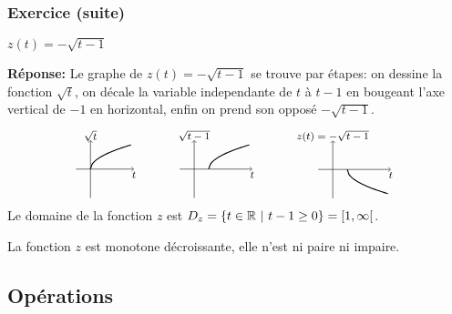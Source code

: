 \begin{frame}[plain]
\frametitle{\bf Exercice (suite)}
\medskip 

\begin{itemize}
\bitem
$z(t)=-\sqrt{t-1}$
\end{itemize}
\vspace*{2mm}

\pause
{\bf R\'eponse:}
Le graphe de $z(t)= -\sqrt{t-1}$ se trouve par \'etapes: 
on dessine la fonction $\sqrt{t}$, on d\'ecale la variable independante 
de $t$ \`a $t-1$ en bougeant l'axe vertical de $-1$ en horizontal, 
enfin on prend son oppos\'e $-\sqrt{t-1}$.
$$
\raisebox{-\height}{\exoSQRTA} \qquad
\raisebox{-\height}{\exoSQRTB} \qquad
\raisebox{-\height}{\exoSQRTC} 
$$
\pause
Le domaine de la fonction $z$ est\quad 
$D_z=\{ t\in\mathbb R\ |\ t-1\geq 0 \} = [1,\infty[$. 
\vspace*{1mm}

\parbox{10cm}{
La fonction $z$ est monotone d\'ecroissante, elle n'est ni paire ni impaire.}

\end{frame}


\subsection{Op\'erations} 

